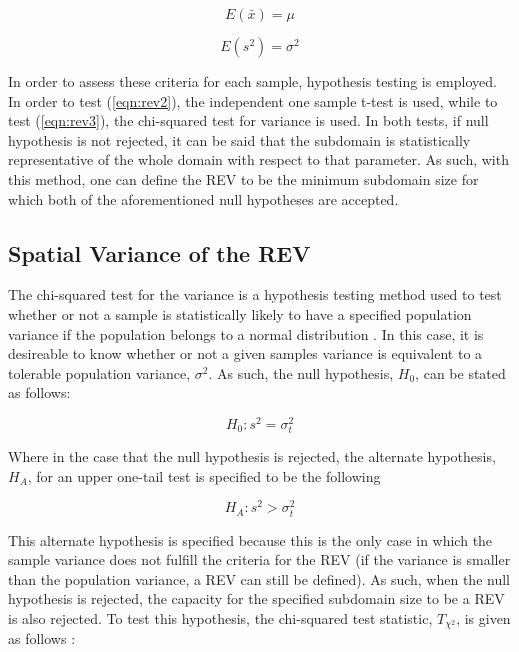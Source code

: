 \begin{equation}
E\left(\bar{x}\right) = \mu
\label{eqn:rev2}
\end{equation}

\begin{equation}
E\left(s^2\right) = \sigma^2
\label{eqn:rev3}
\end{equation}

In order to assess these criteria for each sample, hypothesis testing is employed. In order to test (\ref{eqn:rev2}), the independent one sample t-test is used, while to test (\ref{eqn:rev3}), the chi-squared test for variance is used. In both tests, if null hypothesis is not rejected, it can be said that the subdomain is statistically representative of the whole domain with respect to that parameter. As such, with this method, one can define the REV to be the minimum subdomain size for which both of the aforementioned null hypotheses are accepted.

\subsection{Spatial Variance of the REV}

The chi-squared test for the variance is a hypothesis testing method used to test whether or not a sample is statistically likely to have a specified population variance if the population belongs to a normal distribution \citep{walpole_probability_2007}. In this case, it is desireable to know whether or not a given samples variance is equivalent to a tolerable population variance, $\sigma^2$. As such, the null hypothesis, $H_0$, can be stated as follows:

\begin{equation}
H_0:s^2=\sigma_t^2
\label{eqn:rev4}
\end{equation}

Where in the case that the null hypothesis is rejected, the alternate hypothesis, $H_A$, for an upper one-tail test is specified to be the following

\begin{equation}
H_A:s^2>\sigma_t^2
\label{eqn:rev5}
\end{equation}

This alternate hypothesis is specified because this is the only case in which the sample variance does not fulfill the criteria for the REV (if the variance is smaller than the population variance, a REV can still be defined). As such, when the null hypothesis is rejected, the capacity for the specified subdomain size to be a REV is also rejected. To test this hypothesis, the chi-squared test statistic, $T_{\chi^2}$, is given as follows \citep{walpole_probability_2007}:

